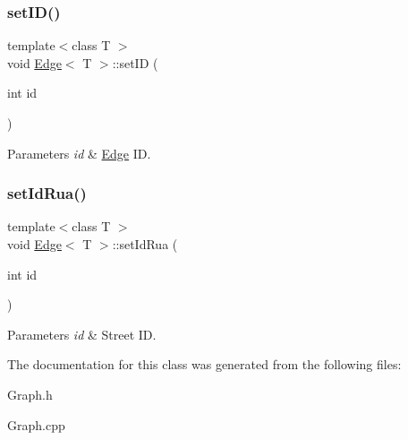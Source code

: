 \subsubsection{\texorpdfstring{set\+I\+D()}{setID()}}
{\footnotesize\ttfamily template$<$class T $>$ \\
void \hyperlink{class_edge}{Edge}$<$ T $>$\+::set\+ID (\begin{DoxyParamCaption}\item[{int}]{id }\end{DoxyParamCaption})}


\begin{DoxyParams}{Parameters}
{\em id} & \hyperlink{class_edge}{Edge} ID. \\
\hline
\end{DoxyParams}
\mbox{\label{class_edge_ab9dd68e497ed9abdf8f5f97215045acc}} 
\subsubsection{\texorpdfstring{set\+Id\+Rua()}{setIdRua()}}
{\footnotesize\ttfamily template$<$class T $>$ \\
void \hyperlink{class_edge}{Edge}$<$ T $>$\+::set\+Id\+Rua (\begin{DoxyParamCaption}\item[{int}]{id }\end{DoxyParamCaption})}


\begin{DoxyParams}{Parameters}
{\em id} & Street ID. \\
\hline
\end{DoxyParams}


The documentation for this class was generated from the following files\+:\begin{DoxyCompactItemize}
\item 
Graph.\+h\item 
Graph.\+cpp\end{DoxyCompactItemize}
